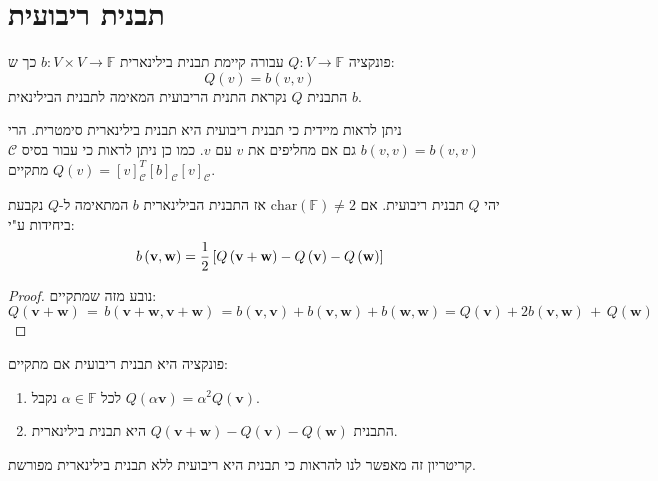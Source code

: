 \documentclass{tstextbook}
\begin{document}
\section{תבנית ריבועית}

\begin{definition}
פונקציה \(Q:V\to \mathbb{F}\) עבורה קיימת תבנית בילינארית \(b:V\times V\to \mathbb{F}\)  כך ש:
$$Q(v)=b(v,v)$$
התבנית \(Q\) נקראת התנית הריבועית המאימה לתבנית הבילינאית \(b\).

\end{definition}
\begin{remark}
ניתן לראות מיידית כי תבנית ריבועית היא תבנית בילינארית סימטרית. הרי \(b(v,v)=b(v,v)\) גם אם מחליפים את \(v\) עם \(v\). כמו כן ניתן לראות כי עבור בסיס \(\mathcal{ C}\) מתקיים \(Q(v)=[v]_{\mathcal{ C} }^{T}[b]_{\mathcal{C} }[v]_{\mathcal{ C} }\).

\end{remark}
\begin{proposition}[פולריזציה]
יהי \(Q\) תבנית ריבועית. אם \(\mathrm{char}\left( \mathbb{F}  \right)\neq 2\) אז התבנית הבילינארית \(b\) המתאימה ל-\(Q\) נקבעת ביחידות ע"י:
$$b\left( \mathbf{v},\mathbf{w} \right)=\frac{1}{2}\left[Q\left( {\bf v}+{\bf w} \right)-
Q\left( {\bf v} \right)-Q\left( {\bf w} \right)\right]$$

\end{proposition}
\begin{proof}
נובע מזה שמתקיים:
$$Q\left( \mathbf{v}+\mathbf{w} \right)\,=\,b\left( \mathbf{v}+\mathbf{w},\mathbf{v}+\mathbf{w} \right)\,=b\left( \mathbf{v},\mathbf{v} \right)+b\left( \mathbf{v},\mathbf{w} \right)+b\left( \mathbf{w},\mathbf{w} \right)=Q\left( \mathbf{v} \right)+2b\left( \mathbf{v},\mathbf{w} \right)\,+\,Q\left( \mathbf{w} \right)$$

\end{proof}
\begin{proposition}
פונקציה היא תבנית ריבועית אם מתקיים:

\end{proposition}
\begin{enumerate}
  \item לכל \(\alpha \in \mathbb{F}\) נקבל \(Q\left( \alpha \mathbf{v} \right)=\alpha^{2}Q\left( \mathbf{v} \right)\). 


  \item התבנית \(Q\left( \mathbf{v}+\mathbf{w} \right)-Q\left( \mathbf{v} \right)-Q\left( \mathbf{w} \right)\) היא תבנית בילינארית. 


\end{enumerate}
קריטריון זה מאפשר לנו להראות כי תבנית היא ריבועית ללא תבנית בילינארית מפורשת.
\end{document}
